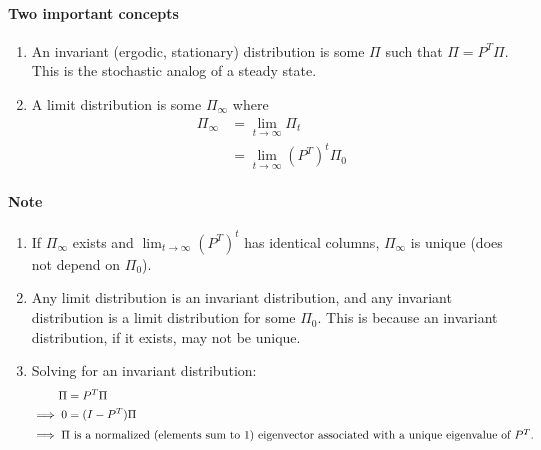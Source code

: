 \documentclass[11pt]{article}
\begin{document}
\paragraph{Two important concepts}
\begin{enumerate}
\item An invariant (ergodic, stationary) distribution is some $\Pi$ such that $\Pi = P^T \Pi$. This is the stochastic analog of a steady state.
\item A limit distribution is some $\Pi_\infty$ where
\begin{align*}
\Pi_\infty &= \lim_{t \to \infty} \Pi_t \\
&= \lim_{t \to \infty} (P^T)^t \Pi_0
\end{align*}
\end{enumerate}
\paragraph{Note}
\begin{enumerate}
\item If $\Pi_\infty$ exists and $\lim_{t \to \infty} (P^T)^t$ has identical columns, $\Pi_\infty$ is unique (does not depend on $\Pi_0$).
\item Any limit distribution is an invariant distribution, and any invariant distribution is a limit distribution for some $\Pi_0$. This is because an invariant distribution, if it exists, may not be unique.
\item Solving for an invariant distribution:
\begin{align*}
\Pi &= P^T \Pi\\
\implies 0 &= (I - P^T)\Pi\\
\intertext{$\implies \Pi$ is a normalized (elements sum to $1$) eigenvector associated with a unique eigenvalue of $P^T$.}
\end{align*}
\end{enumerate}
\end{document}
